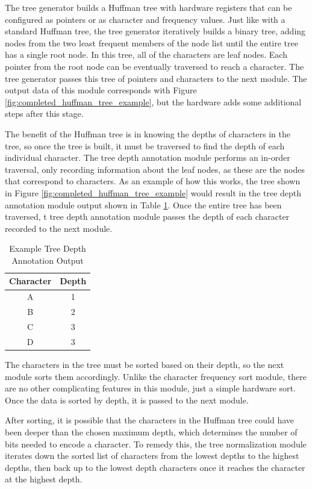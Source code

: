 \documentclass[doublespace,nopageskip]{VTthesis}
\begin{document}
The tree generator builds a Huffman tree with hardware registers that can be configured as pointers or as character and frequency values. Just like with a standard Huffman tree, the tree generator iteratively builds a binary tree, adding nodes from the two least frequent members of the node list until the entire tree has a single root node. In this tree, all of the characters are leaf nodes. Each pointer from the root node can be eventually traversed  to reach a character. The tree generator passes this tree of pointers and characters to the next module. The output data of this module corresponds with Figure \ref{fig:completed_huffman_tree_example}, but the hardware adds some additional steps after this stage.

The benefit of the Huffman tree is in knowing the depths of characters in the tree, so once the tree is built, it must be traversed to find the depth of each individual character. The tree depth annotation module performs an in-order traversal, only recording information about the leaf nodes, as these are the nodes that correspond to characters. As an example of how this works, the tree shown in Figure \ref{fig:completed_huffman_tree_example} would result in the tree depth annotation module output shown in Table \ref{tab:tree_depth_annotation_output}. Once the entire tree has been traversed, t tree depth annotation module passes the depth of each character recorded to the next module.

\begin{table}[htb]
	\centering
	\caption{Example Tree Depth Annotation Output}
	\begin{tabular}{cc}
	    \toprule
	    Character & Depth \\
	    \midrule
	    A & 1 \\
	    \midrule
	    B & 2 \\
	    \midrule
	    C & 3 \\
	    \midrule
	    D & 3 \\
	    \bottomrule
	\end{tabular}
	\label{tab:tree_depth_annotation_output}
\end{table}

The characters in the tree must be sorted based on their depth, so the next module sorts them accordingly. Unlike the character frequency sort module, there are no other complicating features in this module, just a simple hardware sort. Once the data is sorted by depth, it is passed to the next module.

After sorting, it is possible that the characters in the Huffman tree could have been deeper than the chosen maximum depth, which determines the number of bits needed to encode a character. To remedy this, the tree normalization module iterates down the sorted list of characters from the lowest depths to the highest depths, then back up to the lowest depth characters once it reaches the character at the highest depth.
\end{document}
